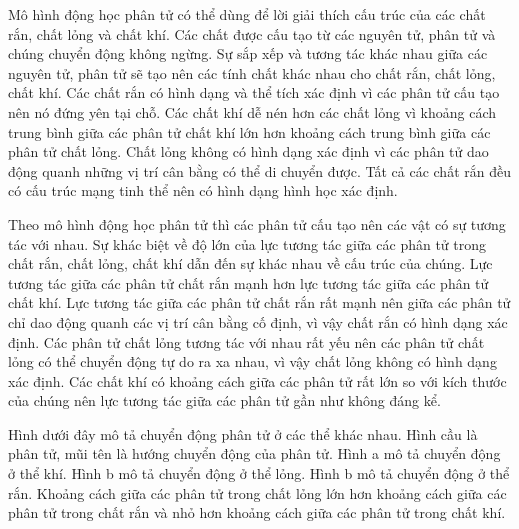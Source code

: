 \begin{ex}
Mô hình động học phân tử có thể dùng để lời giải thích cấu trúc của các chất rắn, chất lỏng và chất khí. Các chất được cấu tạo từ các nguyên tử, phân tử và chúng chuyển động không ngừng. Sự sắp xếp và tương tác khác nhau giữa các nguyên tử, phân tử sẽ tạo nên các tính chất khác nhau cho chất rắn, chất lỏng, chất khí.
\choiceTF
{Các chất rắn có hình dạng và thể tích xác định vì các phân tử cấu tạo nên nó đứng yên tại chỗ.}
{\True Các chất khí dễ nén hơn các chất lỏng vì khoảng cách trung bình giữa các phân tử chất khí lớn hơn khoảng cách trung bình giữa các phân tử chất lỏng.}
{\True Chất lỏng không có hình dạng xác định vì các phân tử dao động quanh những vị trí cân bằng có thể di chuyển được.}
{Tất cả các chất rắn đều có cấu trúc mạng tinh thể nên có hình dạng hình học xác định.} 
\end{ex}

\begin{ex}
Theo mô hình động học phân tử thì các phân tử cấu tạo nên các vật có sự tương tác với nhau. Sự khác biệt về độ lớn của lực tương tác giữa các phân tử trong chất rắn, chất lỏng, chất khí dẫn đến sự khác nhau về cấu trúc của chúng.
\choiceTF
{\True Lực tương tác giữa các phân tử chất rắn mạnh hơn lực tương tác giữa các phân tử chất khí.}
{\True Lực tương tác giữa các phân tử chất rắn rất mạnh nên giữa các phân tử chỉ dao động quanh các vị trí cân bằng cố định, vì vậy chất rắn có hình dạng xác định.}
{Các phân tử chất lỏng tương tác với nhau rất yếu nên các phân tử chất lỏng có thể chuyển động tự do ra xa nhau, vì vậy chất lỏng không có hình dạng xác định.}
{\True Các chất khí có khoảng cách giữa các phân tử rất lớn so với kích thước của chúng nên lực tương tác giữa các phân tử gần như không đáng kể.}
\end{ex}

\begin{ex}
Hình dưới đây mô tả chuyển động phân tử ở các thể khác nhau. Hình cầu là phân tử, mũi tên là hướng chuyển động của phân tử. 
\choiceTF
{\True Hình a mô tả chuyển động ở thể khí.}
{Hình b mô tả chuyển động ở thể lỏng.}
{Hình b mô tả chuyển động ở thể rắn.}
{\True Khoảng cách giữa các phân tử trong chất lỏng lớn hơn khoảng cách giữa các phân tử trong chất rắn và nhỏ hơn khoảng cách giữa các phân tử trong chất khí.} 
\end{ex}
